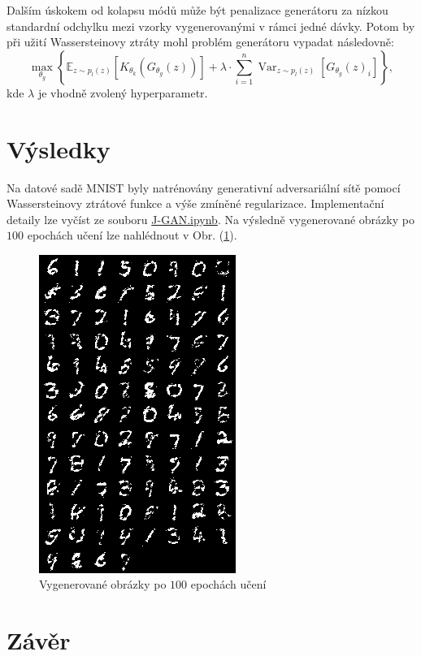 \documentclass[czech]{article}
\begin{document}
Dalším úskokem od kolapsu módů může být penalizace generátoru za nízkou standardní odchylku mezi vzorky vygenerovanými v rámci jedné dávky.
Potom by při užití Wassersteinovy ztráty mohl problém generátoru vypadat následovně:
\begin{equation}
    \max_{\theta_g} \left\{ \mathbb{E}_{z \sim p_l(z)} \left[K_{\theta_k}\left(G_{\theta_g}(z)\right)\right]
     + \lambda \cdot \sum_{i = 1}^{n} \operatorname{Var}_{z \sim p_l(z)} \left[G_{\theta_g}(z)_i\right]\right\},
\end{equation}
kde $\lambda$ je vhodně zvolený hyperparametr.

\section{Výsledky}

Na datové sadě MNIST \cite{MNIST} byly natrénovány generativní adversariální sítě pomocí Wassersteinovy ztrátové funkce
a výše zmíněné regularizace.
Implementační detaily lze vyčíst ze souboru \href{https://github.com/pavel-jaks/gans/blob/main/code/J-GAN.ipynb}{J-GAN.ipynb}.
Na výsledně vygenerované obrázky po $100$ epochách učení lze nahlédnout v Obr. (\ref{obr}).

\begin{figure}
    \centering
    \includegraphics{graphics/samples_100.png}
    \caption{Vygenerované obrázky po $100$ epochách učení}
    \label{obr}
\end{figure}

\section*{Závěr}
\end{document}
